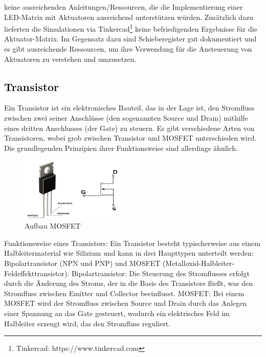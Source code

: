\begin{enumerate}
	keine ausreichenden Anleitungen/Ressourcen, die die Implementierung einer LED-Matrix mit Aktuatoren ausreichend
	unterstützen würden. Zusätzlich dazu lieferten die Simulationen via Tinkercad\footnote{Tinkercad: https://www.tinkercad.com} keine befriedigenden Ergebnisse
	für die Aktuator-Matrix.
	Im Gegensatz dazu sind Schieberegister gut dokumentiert und es gibt ausreichende Ressourcen, um ihre
	Verwendung für die Ansteuerung von Aktuatoren zu verstehen und umzusetzen.
\end{enumerate}

\subsection{Transistor}
Ein Transistor ist ein elektronisches Bauteil, das in der Lage ist, den Stromfluss zwischen zwei seiner Anschlüsse
(den sogenannten Source und Drain) mithilfe eines dritten Anschlusses (der Gate) zu steuern. Es gibt verschiedene Arten
von Transistoren, wobei grob zwischen Transistor und MOSFET unterschieden wird.
Die grundlegenden Prinzipien ihrer Funktionsweise sind allerdings ähnlich.

\begin{figure}[htbp]
	\centering
	\includegraphics[width=0.45\textwidth]{img/Mosfet}
	\caption{Aufbau MOSFET}
	\label{img:transistor}
\end{figure}

Funktionsweise eines Transistors:
Ein Transistor besteht typischerweise aus einem Halbleitermaterial wie Silizium und kann in drei Haupttypen unterteilt
werden: Bipolartransistor (NPN und PNP) und MOSFET (Metalloxid-Halbleiter-Feldeffekttransistor).  \newline
Bipolartransistor: Die Steuerung des Stromflusses erfolgt durch die Änderung des Stroms, der in die Basis des
Transistors fließt, was den Stromfluss zwischen Emitter und Collector beeinflusst. \newline
MOSFET: Bei einem MOSFET wird der Stromfluss zwischen Source und Drain durch das Anlegen einer Spannung an das Gate
gesteuert, wodurch ein elektrisches Feld im Halbleiter erzeugt wird, das den Stromfluss reguliert. \newline

